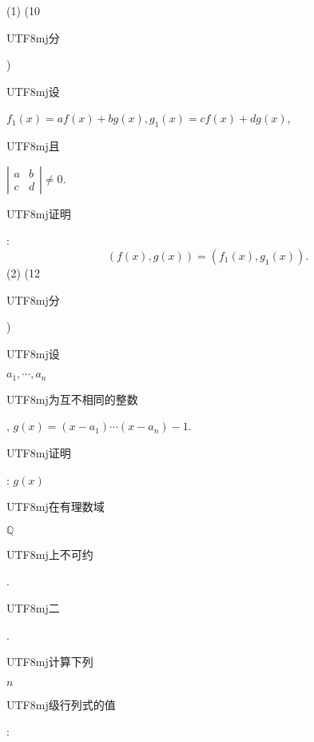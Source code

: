 \documentclass[10pt]{article}
\begin{document}
(1) (10 \begin{CJK}{UTF8}{mj}分\end{CJK}) \begin{CJK}{UTF8}{mj}设\end{CJK} $f_{1}(x)=a f(x)+b g(x), g_{1}(x)=c f(x)+d g(x)$, \begin{CJK}{UTF8}{mj}且\end{CJK} $\left|\begin{array}{ll}a & b \\ c & d\end{array}\right| \neq 0$. \begin{CJK}{UTF8}{mj}证明\end{CJK}:
$$
(f(x), g(x))=\left(f_{1}(x), g_{1}(x)\right) .
$$
(2) (12 \begin{CJK}{UTF8}{mj}分\end{CJK}) \begin{CJK}{UTF8}{mj}设\end{CJK} $a_{1}, \cdots, a_{n}$ \begin{CJK}{UTF8}{mj}为互不相同的整数\end{CJK}, $g(x)=\left(x-a_{1}\right) \cdots\left(x-a_{n}\right)-1$. \begin{CJK}{UTF8}{mj}证明\end{CJK}: $g(x)$ \begin{CJK}{UTF8}{mj}在有理数域\end{CJK} $\mathbb{Q}$ \begin{CJK}{UTF8}{mj}上不可约\end{CJK}.

\begin{CJK}{UTF8}{mj}二\end{CJK}. \begin{CJK}{UTF8}{mj}计算下列\end{CJK} $n$ \begin{CJK}{UTF8}{mj}级行列式的值\end{CJK}:
\end{document}
